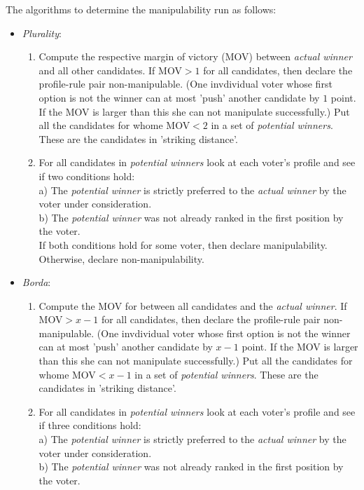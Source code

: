 \documentclass[10pt,a4paper]{article}
\begin{document}
\noindent The algorithms to determine the manipulability run as follows:\\
\begin{itemize}
\item \textit{Plurality}: \begin{enumerate}
\item  Compute the respective margin of victory (MOV) between \textit{actual winner} and all other candidates. If MOV$>1$ for all candidates, then declare the profile-rule pair non-manipulable. (One invdividual voter whose first option is not the winner can at most 'push' another candidate by $1$ point. If the MOV is larger than this she can not manipulate successfully.) Put all the candidates for whome MOV$<2$ in a set of \textit{potential winners}. These are the candidates in 'striking distance'.
\item For all candidates in \textit{potential winners} look at each voter's profile and see if two conditions hold: \\
a) The \textit{potential winner} is strictly preferred to the \textit{actual winner} by the voter under consideration.\\
b) The \textit{potential winner} was not already ranked in the first position by the voter.\\
If both conditions hold for some voter, then declare manipulability. Otherwise, declare non-manipulability.
\end{enumerate}
\item \textit{Borda}: \begin{enumerate}
\item Compute the MOV for between all candidates and the \textit{actual winner}. If MOV$>x-1$ for all candidates, then declare the profile-rule pair non-manipulable. (One invdividual voter whose first option is not the winner can at most 'push' another candidate by $x-1$ point. If the MOV is larger than this she can not manipulate successfully.) Put all the candidates for whome MOV$<x-1$ in a set of \textit{potential winners}. These are the candidates in 'striking distance'.
\item For all candidates in \textit{potential winners} look at each voter's profile and see if three conditions hold: \\
a) The \textit{potential winner} is strictly preferred to the \textit{actual winner} by the voter under consideration.\\
b) The \textit{potential winner} was not already ranked in the first position by the voter.\\

\end{enumerate}
\end{itemize}
\end{document}

